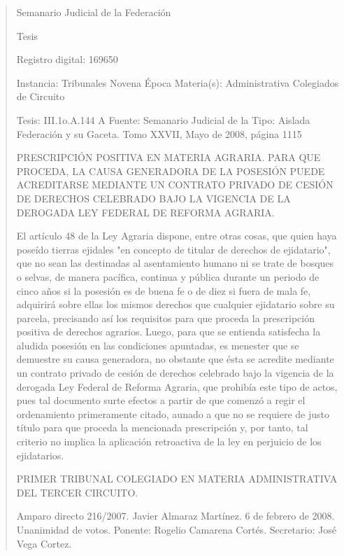 \documentclass[11pt,a4paper]{article}
\begin{document}
\begin{quote}
                                                   Semanario Judicial de la Federación

                                                  Tesis

 Registro digital: 169650

 Instancia: Tribunales              Novena Época                           Materia(s): Administrativa
 Colegiados de Circuito

 Tesis: III.1o.A.144 A              Fuente: Semanario Judicial de la Tipo: Aislada
                                    Federación y su Gaceta.
                                    Tomo XXVII, Mayo de 2008, página
                                    1115


PRESCRIPCIÓN POSITIVA EN MATERIA AGRARIA. PARA QUE PROCEDA, LA CAUSA
GENERADORA DE LA POSESIÓN PUEDE ACREDITARSE MEDIANTE UN CONTRATO
PRIVADO DE CESIÓN DE DERECHOS CELEBRADO BAJO LA VIGENCIA DE LA DEROGADA
LEY FEDERAL DE REFORMA AGRARIA.


El artículo 48 de la Ley Agraria dispone, entre otras cosas, que quien haya poseído tierras ejidales
"en concepto de titular de derechos de ejidatario", que no sean las destinadas al asentamiento
humano ni se trate de bosques o selvas, de manera pacífica, continua y pública durante un periodo
de cinco años si la posesión es de buena fe o de diez si fuera de mala fe, adquirirá sobre ellas los
mismos derechos que cualquier ejidatario sobre su parcela, precisando así los requisitos para que
proceda la prescripción positiva de derechos agrarios. Luego, para que se entienda satisfecha la
aludida posesión en las condiciones apuntadas, es menester que se demuestre su causa
generadora, no obstante que ésta se acredite mediante un contrato privado de cesión de derechos
celebrado bajo la vigencia de la derogada Ley Federal de Reforma Agraria, que prohibía este tipo
de actos, pues tal documento surte efectos a partir de que comenzó a regir el ordenamiento
primeramente citado, aunado a que no se requiere de justo título para que proceda la mencionada
prescripción y, por tanto, tal criterio no implica la aplicación retroactiva de la ley en perjuicio de los
ejidatarios.

PRIMER TRIBUNAL COLEGIADO EN MATERIA ADMINISTRATIVA DEL TERCER CIRCUITO.


Amparo directo 216/2007. Javier Almaraz Martínez. 6 de febrero de 2008. Unanimidad de votos.
Ponente: Rogelio Camarena Cortés. Secretario: José Vega Cortez.


\end{quote}
\end{document}
